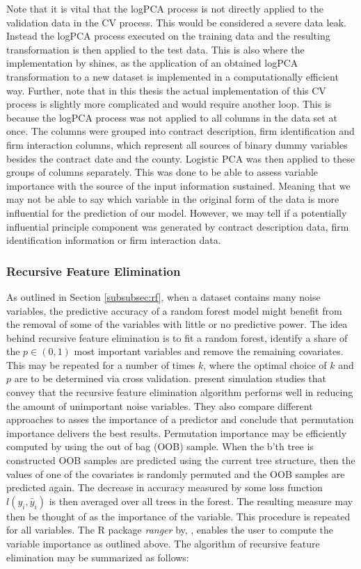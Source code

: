 \documentclass[a4paper,12pt, headsepline]{scrartcl}
\numberwithin{equation}{section}
\begin{document}
Note that it is vital that the logPCA process is not directly applied to the validation data in the CV process. This would be considered a severe data leak. Instead the logPCA process executed on the training data and the resulting transformation is then applied to the test data. This is also where the implementation by \citet{logPCA} shines, as the application of an obtained logPCA transformation to a new dataset is implemented in a computationally efficient way. Further, note that in this thesis the actual implementation of this CV process is slightly more complicated and would require another loop. This is because the logPCA process was not applied to all columns in the data set at once. The columns were grouped into contract description, firm identification and firm interaction columns, which represent all sources of binary dummy variables besides the contract date and the county. Logistic PCA was then applied to these groups of columns separately. This was done to be able to assess variable importance with the source of the input information sustained. Meaning that we may not be able to say which variable in the original form of the data is more influential for the prediction of our model. However, we may tell if a potentially influential principle component was generated by contract description data, firm identification information or firm interaction data.

\subsubsection{Recursive Feature Elimination}\label{subsubsec:rfe}
As outlined in Section \ref{subsubsec:rf}, when a dataset contains many noise variables, the predictive accuracy of a random forest model might benefit from the removal of some of the variables with little or no predictive power. The idea behind recursive feature elimination is to fit a random forest, identify a share of the $p \in (0, 1)$ most important variables and remove the remaining covariates. This may be repeated for a number of times $k$, where the optimal choice of $k$ and $p$ are to be determined via cross validation. \citet{gregorutti13} present simulation studies that convey that the recursive feature elimination algorithm performs well in reducing the amount of unimportant noise variables. They also compare different approaches to asses the importance of a predictor and conclude that permutation importance delivers the best results. Permutation importance may be efficiently computed by using the out of bag  (OOB) sample. When the b'th tree is constructed OOB samples are predicted using the current tree structure, then the values of one of the covariates is randomly permuted and the OOB samples are predicted again. The decrease in accuracy measured by some loss function $l(y_i, \hat y_i)$ is then averaged over all trees in the forest. The resulting measure may then be thought of as the importance of the variable. This procedure is repeated for all variables. The R package \textit{ranger} by, \citet{ranger}, enables the user to compute the variable importance as outlined above. The algorithm of recursive feature elimination may be summarized as follows:
\end{document}
